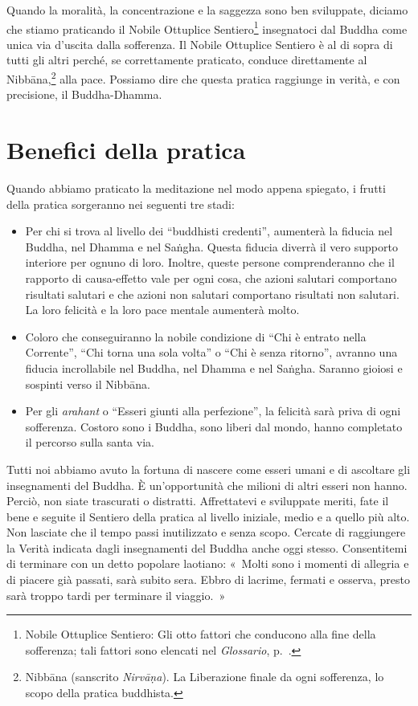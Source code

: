 Quando la moralità, la concentrazione e la saggezza sono ben sviluppate,
diciamo che stiamo praticando il Nobile Ottuplice Sentiero\footnote{Nobile
  Ottuplice Sentiero: Gli otto fattori che conducono alla fine della
  sofferenza; tali fattori sono elencati nel \emph{Glossario}, p.~\pageref{glossary-ottuplice}.}
insegnatoci dal Buddha come unica via d'uscita dalla sofferenza. Il
Nobile Ottuplice Sentiero è al di sopra di tutti gli altri perché, se
correttamente praticato, conduce direttamente al
Nibbāna,\footnote{Nibbāna (sanscrito \emph{Nirvāṇa}). La
  Liberazione finale da ogni sofferenza, lo scopo della pratica
  buddhista.} alla pace. Possiamo dire che questa pratica raggiunge in
verità, e con precisione, il Buddha-Dhamma.

\section{Benefici della pratica}

Quando abbiamo praticato la meditazione nel modo appena spiegato, i
frutti della pratica sorgeranno nei seguenti tre stadi:

\begin{itemize}

\item Per chi si trova al livello dei ``buddhisti credenti'', aumenterà
  la fiducia nel Buddha, nel Dhamma e nel Saṅgha. Questa fiducia diverrà
  il vero supporto interiore per ognuno di loro. Inoltre, queste persone
  comprenderanno che il rapporto di causa-effetto vale per ogni cosa,
  che azioni salutari comportano risultati salutari e che azioni non
  salutari comportano risultati non salutari. La loro felicità e la loro
  pace mentale aumenterà molto.

\item Coloro che conseguiranno la nobile condizione di ``Chi è entrato nella
  Corrente'', ``Chi torna una sola volta'' o ``Chi è senza ritorno'', avranno
  una fiducia incrollabile nel Buddha, nel Dhamma e nel Saṅgha. Saranno gioiosi
  e sospinti verso il Nibbāna.

\item Per gli \emph{arahant} o ``Esseri giunti alla perfezione'', la felicità
  sarà priva di ogni sofferenza. Costoro sono i Buddha, sono liberi dal mondo,
  hanno completato il percorso sulla santa via.

\end{itemize}

Tutti noi abbiamo avuto la fortuna di nascere come esseri umani e di
ascoltare gli insegnamenti del Buddha. È un'opportunità che milioni di
altri esseri non hanno. Perciò, non siate trascurati o distratti.
Affrettatevi e sviluppate meriti, fate il bene e seguite il Sentiero
della pratica al livello iniziale, medio e a quello più alto. Non
lasciate che il tempo passi inutilizzato e senza scopo. Cercate di
raggiungere la Verità indicata dagli insegnamenti del Buddha anche oggi
stesso. Consentitemi di terminare con un detto popolare laotiano:
«~Molti sono i momenti di allegria e di piacere già passati, sarà subito
sera. Ebbro di lacrime, fermati e osserva, presto sarà troppo tardi per
terminare il viaggio.~»

